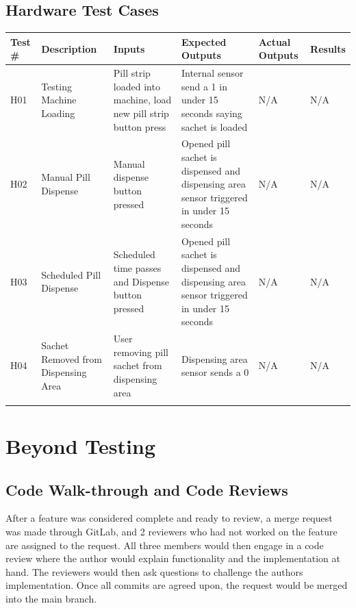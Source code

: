 \documentclass[12pt]{article}
\begin{document}
\subsection{Hardware Test Cases}
\begin{tabularx}{\textwidth}{|X|X|X|X|X|X|}
        \hline
        Test \#     & Description     & Inputs      & Expected Outputs  & Actual Outputs    & Results   \\
        \hline
         H01     & Testing Machine Loading  & Pill strip loaded into machine, load new pill strip button press    & Internal sensor send a 1 in under 15 seconds saying sachet is loaded  & N/A & N/A   \\
        \hline
         H02     & Manual Pill Dispense   & Manual dispense button pressed  &  Opened pill sachet is dispensed and dispensing area sensor triggered in under 15 seconds  & N/A & N/A  \\
        \hline
         H03     & Scheduled Pill Dispense   & Scheduled time passes and Dispense button pressed  &  Opened pill sachet is dispensed and dispensing area sensor triggered in under 15 seconds  & N/A & N/A  \\
        \hline
         H04     & Sachet Removed from Dispensing Area   & User removing pill sachet from dispensing area  & Dispensing area sensor sends a 0  & N/A & N/A  \\
        \hline
    \caption{Hardware Testing} %
\end{tabularx}


\section{Beyond Testing}

\subsection{Code Walk-through and Code Reviews}
After a feature was considered complete and ready to review, a merge request was made through GitLab, and 2 reviewers who had not worked on the feature are assigned to the request. All three members would then engage in a code review where the author would explain functionality and the implementation at hand. The reviewers would then ask questions to challenge the authors implementation. Once all commits are agreed upon, the request would be merged into the main branch.
\end{document}
